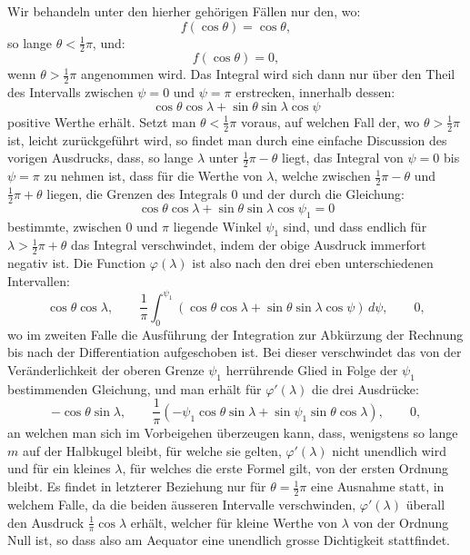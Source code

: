 \documentclass[11pt]{article}
\newcommand{\dd}{\,d}
\begin{document}
Wir behandeln unter den hierher gehörigen Fällen nur den, wo:
\[
 f(\cos\theta)=\cos\theta,
\]
so lange $\theta<\frac12\pi$, und:
\[
 f(\cos\theta)=0,
\]
wenn $\theta>\frac12\pi$ angenommen wird. Das Integral wird sich dann nur über den Theil des Intervalls zwischen $\psi=0$ und $\psi=\pi$ erstrecken, innerhalb dessen:
\[
 \cos\theta\cos\lambda+\sin\theta\sin\lambda\cos\psi
\]
positive Werthe erhält. Setzt man $\theta<\frac12\pi$ voraus, auf welchen Fall der, wo $\theta>\frac12\pi$ ist, leicht zurückgeführt wird, so findet man durch eine einfache Discussion des vorigen Ausdrucks, dass, so lange $\lambda$ unter $\frac12\pi-\theta$ liegt, das Integral von $\psi=0$ bis $\psi=\pi$ zu nehmen ist, dass für die Werthe von $\lambda$, welche zwischen $\frac12\pi-\theta$ und $\frac12\pi+\theta$ liegen, die Grenzen des Integrals $0$ und der durch die Gleichung:
\[
 \cos\theta\cos\lambda+\sin\theta\sin\lambda\cos\psi_1=0
\]
bestimmte, zwischen $0$ und $\pi$ liegende Winkel $\psi_1$ sind, und dass endlich für $\lambda>\frac12\pi+\theta$ das Integral verschwindet, indem der obige Ausdruck immerfort negativ ist. Die Function $\varphi(\lambda)$ ist also nach den drei eben unterschiedenen Intervallen:
\[
 \cos\theta\cos\lambda,
\qquad
 \frac1\pi\int_0^{\psi_1}(\cos\theta\cos\lambda+\sin\theta\sin\lambda\cos\psi)\dd\psi,
\qquad
 0,
\]
wo im zweiten Falle die Ausführung der Integration zur Abkürzung der Rechnung bis nach der Differentiation aufgeschoben ist. Bei dieser verschwindet das von der Veränderlichkeit der oberen Grenze $\psi_1$ herrührende Glied in Folge der $\psi_1$ bestimmenden Gleichung, und man erhält für $\varphi'(\lambda)$ die drei Ausdrücke:
\[
 -\cos\theta\sin\lambda,
\qquad
 \frac1\pi(-\psi_1\cos\theta\sin\lambda+\sin\psi_1\sin\theta\cos\lambda),
\qquad
 0,
\]
an welchen man sich im Vorbeigehen überzeugen kann, dass, wenigstens so lange $m$ auf der Halbkugel bleibt, für welche sie gelten, $\varphi'(\lambda)$ nicht unendlich wird und für ein kleines $\lambda$, für welches die erste Formel gilt, von der ersten Ordnung bleibt. Es findet in letzterer Beziehung nur für $\theta=\frac12\pi$ eine Ausnahme statt, in welchem Falle, da die beiden äusseren Intervalle verschwinden, $\varphi'(\lambda)$ überall den Ausdruck $\frac1\pi\cos\lambda$ erhält, welcher für kleine Werthe von $\lambda$ von der Ordnung Null ist, so dass also am Aequator eine unendlich grosse Dichtigkeit stattfindet.
\end{document}
